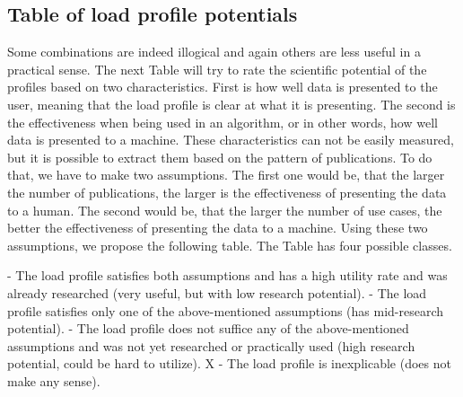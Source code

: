 \subsection{Table of load profile potentials} \label{subsec:potential}

Some combinations are indeed illogical and again others are less useful in a practical sense.
The next Table will try to rate the scientific potential of the profiles based on two characteristics. 
First is how well data is presented to the user,
meaning that the load profile is clear at what it is presenting.
The second is the effectiveness when being used in an algorithm, or in other words, how well data is presented to a machine. 
These characteristics can not be easily measured,
but it is possible to extract them based on the pattern of publications.
To do that, we have to make two assumptions.
The first one would be, that the larger the number of publications, the larger is the effectiveness of presenting the data to a human.
The second would be, that the larger the number of use cases, the better the effectiveness of presenting the data to a machine.
Using these two assumptions, we propose the following table. 
The Table has four possible classes. 

\begin{outline} 
 - The load profile satisfies both assumptions and has a high utility rate and was already researched (very useful, but with low research potential). 
 - The load profile satisfies only one of the above-mentioned assumptions (has mid-research potential).
 - The load profile does not suffice any of the above-mentioned assumptions and was not yet researched or practically used (high research potential, could be hard to utilize).
\1 X - The load profile is inexplicable (does not make any sense).
\end{outline}

